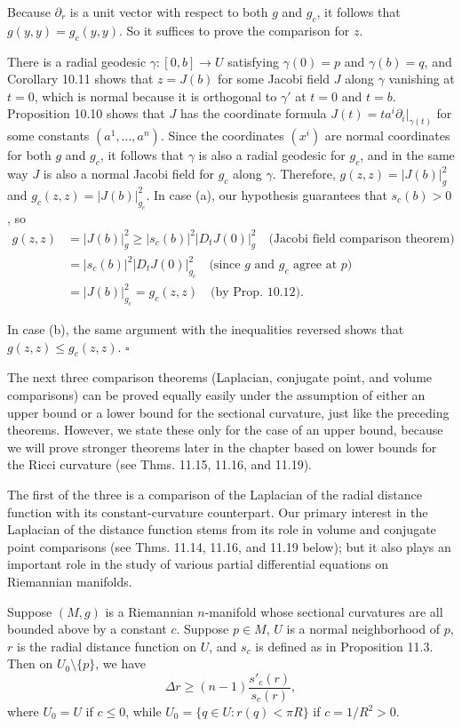 Because $\partial_r$ is a unit vector with respect to both $g$ and $g_c$, it follows that $g(y, y) = g_c(y, y)$. So it suffices to prove the comparison for $z$.

There is a radial geodesic $\gamma : [0, b] \to U$ satisfying $\gamma(0) = p$ and $\gamma(b) = q$, and Corollary 10.11 shows that $z = J(b)$ for some Jacobi field $J$ along $\gamma$ vanishing at $t = 0$, which is normal because it is orthogonal to $\gamma'$ at $t = 0$ and $t = b$. Proposition 10.10 shows that $J$ has the coordinate formula $J(t) = ta^i \partial_i|_{\gamma(t)}$ for some constants $(a^1, \ldots, a^n)$. Since the coordinates $(x^i)$ are normal coordinates for both $g$ and $g_c$, it follows that $\gamma$ is also a radial geodesic for $g_c$, and in the same way $J$ is also a normal Jacobi field for $g_c$ along $\gamma$. Therefore, $g(z, z) = |J(b)|^2_g$ and $g_c(z, z) = |J(b)|^2_{g_c}$. In case (a), our hypothesis guarantees that $s_c(b) > 0$, so
\begin{align*}
g(z, z) &= |J(b)|^2_g \ge |s_c(b)|^2 |D_t J(0)|^2_g \quad \text{(Jacobi field comparison theorem)} \\
&= |s_c(b)|^2 |D_t J(0)|^2_{g_c} \quad \text{(since $g$ and $g_c$ agree at $p$)} \\
&= |J(b)|^2_{g_c} = g_c(z, z) \quad \text{(by Prop. 10.12)}.
\end{align*}

In case (b), the same argument with the inequalities reversed shows that $g(z, z) \le g_c(z, z)$. \hfill$\square$

The next three comparison theorems (Laplacian, conjugate point, and volume comparisons) can be proved equally easily under the assumption of either an upper bound or a lower bound for the sectional curvature, just like the preceding theorems. However, we state these only for the case of an upper bound, because we will prove stronger theorems later in the chapter based on lower bounds for the Ricci curvature (see Thms. 11.15, 11.16, and 11.19).

The first of the three is a comparison of the Laplacian of the radial distance function with its constant-curvature counterpart. Our primary interest in the Laplacian of the distance function stems from its role in volume and conjugate point comparisons (see Thms. 11.14, 11.16, and 11.19 below); but it also plays an important role in the study of various partial differential equations on Riemannian manifolds.

\begin{theorem}
\label{thm:laplacian-comparison-1}

Suppose $(M, g)$ is a Riemannian $n$-manifold whose sectional curvatures are all bounded above by a constant $c$. Suppose $p \in M$, $U$ is a normal neighborhood of $p$, $r$ is the radial distance function on $U$, and $s_c$ is defined as in Proposition 11.3. Then on $U_0 \setminus \{p\}$, we have
\[
\Delta r \geq (n-1) \frac{s'_c(r)}{s_c(r)},
\]
where $U_0 = U$ if $c \leq 0$, while $U_0 = \{q \in U : r(q) < \pi R\}$ if $c = 1/R^2 > 0$.
\end{theorem}

